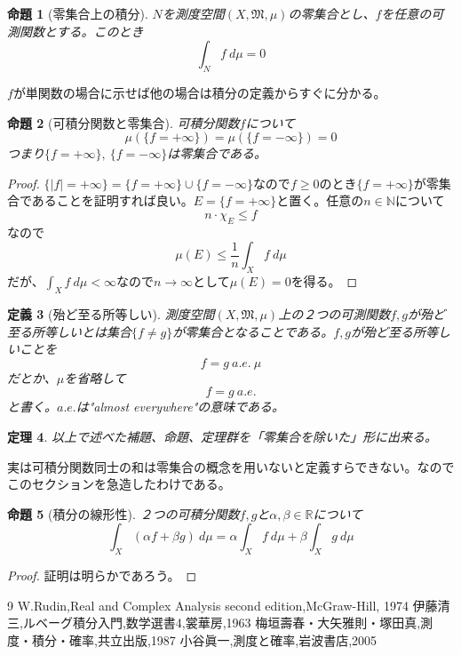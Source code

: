 \documentclass[leqno]{jsarticle}
\newtheorem{thm}{定理}
\newtheorem{prop}[thm]{命題}
\newtheorem{df}[thm]{定義}
\newcommand{\nn}{\mathbb{N}}
\newcommand{\rr}{\mathbb{R}}
\newcommand{\mgn}{\infty}
\newcommand{\dpst}{\displaystyle}
\newcommand{\mm}{\mathfrak{M}}
\newcommand{\al}{\alpha}
\newcommand{\be}{\beta}
\begin{document}
\begin{prop}[零集合上の積分]$N$を測度空間$(X,\mm,\mu)$の零集合とし、$f$を任意の可測関数とする。このとき
\[
\int_{N}f\ d\mu=0
\]
\end{prop}
{\proof $f$が単関数の場合に示せば他の場合は積分の定義からすぐに分かる。}

\begin{prop}[可積分関数と零集合]
可積分関数$f$について
\[
\mu(\{f=+\mgn\})=\mu(\{f=-\mgn\})=0
\]
つまり$\{f=+\mgn\},\ \{f=-\mgn\}$は零集合である。
\end{prop}
\begin{proof}
$\{|f|=+\mgn\}=\{f=+\mgn\}\cup\{f=-\mgn\}$なので$f\ge 0$のとき$\{f=+\mgn\}$が零集合であることを証明すれば良い。$E=\{f=+\mgn\}$と置く。任意の$n\in \nn$について
\[
n\cdot \chi_{E}\le f
\]
なので
\[
\mu(E)\le \frac{1}{n}\int_X f\ d\mu
\]
だが、$\dpst \int_X f\ d\mu<\mgn$なので$n\to \mgn$として$\mu(E)=0$を得る。
\end{proof}

\begin{df}[殆ど至る所等しい]
測度空間$(X,\mm,\mu)$上の２つの可測関数$f,g$が殆ど至る所等しいとは集合$\{f\neq g\}$が零集合となることである。$f,g$が殆ど至る所等しいことを
\[
f=g \ a.e.\ \mu
\]
だとか、$\mu$を省略して
\[
f=g \ a.e.
\]
と書く。$a.e.$は"almost everywhere"の意味である。
\end{df}

\begin{thm}
以上で述べた補題、命題、定理群を「零集合を除いた」形に出来る。
\end{thm}

実は可積分関数同士の和は零集合の概念を用いないと定義すらできない。なのでこのセクションを急造したわけである。


\begin{prop}[積分の線形性]
２つの可積分関数$f,g$と$\al,\be\in \rr$について
\[
\int_X(\al f +\be g)\ d\mu =\al \int_Xf\ d\mu+\be\int_X g\ d\mu
\]
\end{prop}
\begin{proof}
証明は明らかであろう。
\end{proof}



















	
\begin{thebibliography}{9
}W.Rudin,Real and Complex Analysis second edition,McGraw-Hill, 1974
伊藤清三,ルベーグ積分入門,数学選書4,裳華房,1963
梅垣壽春・大矢雅則・塚田真,測度・積分・確率,共立出版,1987
小谷眞一,測度と確率,岩波書店,2005
\end{thebibliography}




			
\end{document}
